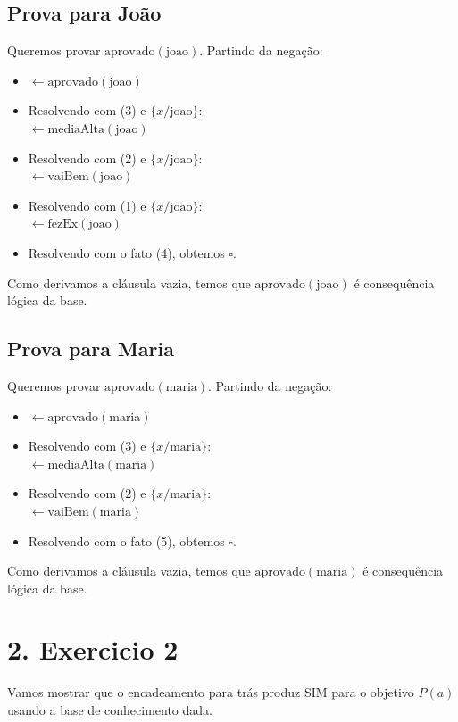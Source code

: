 \documentclass{article}
\begin{document}
\subsection*{Prova para João}
Queremos provar $\text{aprovado}(\text{joao})$. Partindo da negação:
\begin{itemize}
    \item[G0:] $\leftarrow \text{aprovado}(\text{joao})$
    \item[G1:] Resolvendo com (3) e $\{x/\text{joao}\}$: \\
    $\leftarrow \text{mediaAlta}(\text{joao})$
    \item[G2:] Resolvendo com (2) e $\{x/\text{joao}\}$: \\
    $\leftarrow \text{vaiBem}(\text{joao})$
    \item[G3:] Resolvendo com (1) e $\{x/\text{joao}\}$: \\
    $\leftarrow \text{fezEx}(\text{joao})$
    \item[G4:] Resolvendo com o fato (4), obtemos $\square$.
\end{itemize}
Como derivamos a cláusula vazia, temos que $\text{aprovado}(\text{joao})$ é consequência lógica da base.

\subsection*{Prova para Maria}
Queremos provar $\text{aprovado}(\text{maria})$. Partindo da negação:
\begin{itemize}
    \item[G0:] $\leftarrow \text{aprovado}(\text{maria})$
    \item[G1:] Resolvendo com (3) e $\{x/\text{maria}\}$: \\
    $\leftarrow \text{mediaAlta}(\text{maria})$
    \item[G2:] Resolvendo com (2) e $\{x/\text{maria}\}$: \\
    $\leftarrow \text{vaiBem}(\text{maria})$
    \item[G3:] Resolvendo com o fato (5), obtemos $\square$.
\end{itemize}
Como derivamos a cláusula vazia, temos que $\text{aprovado}(\text{maria})$ é consequência lógica da base.

\section*{2. Exercicio 2}

Vamos mostrar que o encadeamento para trás produz SIM para o objetivo $P(a)$ usando a base de conhecimento dada.
\end{document}
